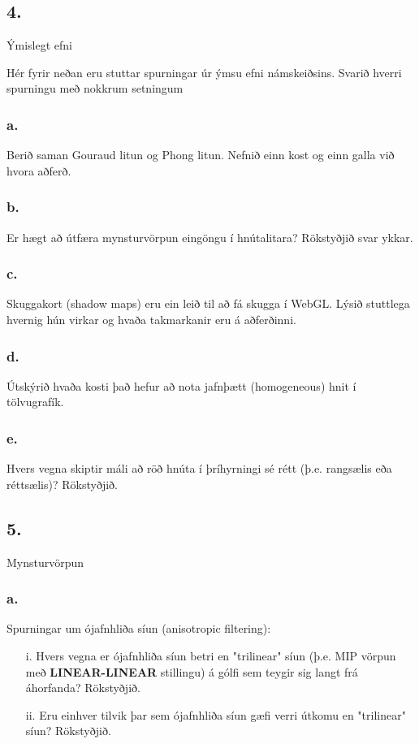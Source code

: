 \documentclass{article}
\begin{document}
\newpage

\subsection{4.} Ýmislegt efni

Hér fyrir neðan eru stuttar spurningar úr ýmsu efni námskeiðsins. Svarið hverri
spurningu með nokkrum setningum

\subsubsection{a.}Berið saman Gouraud litun og Phong litun. Nefnið einn kost og einn galla
við hvora aðferð.

\subsubsection{b.}Er hægt að útfæra mynsturvörpun eingöngu í hnútalitara? Rökstyðjið svar
ykkar.

\subsubsection{c.}Skuggakort (shadow maps) eru ein leið til að fá skugga í WebGL. Lýsið
stuttlega hvernig hún virkar og hvaða takmarkanir eru á aðferðinni.

\subsubsection{d.}Útskýrið hvaða kosti það hefur að nota jafnþætt (homogeneous) hnit í
tölvugrafík.

\subsubsection{e.}Hvers vegna skiptir máli að röð hnúta í þríhyrningi sé rétt (þ.e. rangsælis eða
réttsælis)? Rökstyðjið.

\newpage

\subsection{5.} Mynsturvörpun

\subsubsection{a.}Spurningar um ójafnhliða síun (anisotropic filtering):

\begin{itemize}
    \item[i.]Hvers vegna er ójafnhliða síun betri en "trilinear" síun (þ.e. MIP vörpun
    með \textbf{LINEAR-LINEAR} stillingu) á gólfi sem teygir sig langt frá áhorfanda?
    Rökstyðjið.
    \item[ii.]Eru einhver tilvik þar sem ójafnhliða síun gæfi verri útkomu en "trilinear"
    síun? Rökstyðjið.
\end{itemize}
\end{document}
